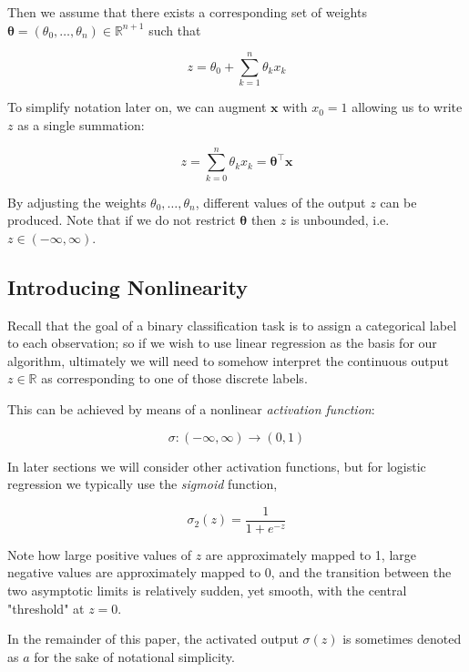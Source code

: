 \documentclass{article}[11pt]
\begin{document}
        Then we assume that there exists a corresponding set of weights $\boldsymbol{\theta} = (\theta_0, \ldots, \theta_n) \in \mathbb{R}^{n+1}$ such that
        
        $$
        z = \theta_0 + \sum_{k=1}^n \theta_k x_k
        $$
        
        To simplify notation later on, we can augment $\mathbf{x}$ with $x_0 = 1$ allowing us to write $z$ as a single summation:
        
        $$
        z = \sum_{k=0}^n \theta_k x_k = \boldsymbol{\theta}^\top \mathbf{x}
        $$
        
        By adjusting the weights $\theta_0, \ldots, \theta_n$, different values of the output $z$ can be produced. Note that if we do not restrict $\boldsymbol{\theta}$ then $z$ is unbounded, i.e. $z \in (-\infty, \infty)$.
        
        
        
    \subsection{Introducing Nonlinearity}
        
        Recall that the goal of a binary classification task is to assign a categorical label to each observation; so if we wish to use linear regression as the basis for our algorithm, ultimately we will need to somehow interpret the continuous output $z \in \mathbb{R}$ as corresponding to one of those discrete labels.
        
        This can be achieved by means of a nonlinear \textit{activation function}:
        
        $$
        \sigma \colon (-\infty, \infty) \to (0, 1)
        $$
        
        In later sections we will consider other activation functions, but for logistic regression we typically use the \textit{sigmoid} function,
            
        $$
        \sigma_2(z) = \frac{1}{1 + e^{-z}}
        $$
        
        
        
        
        Note how large positive values of $z$ are approximately mapped to 1, large negative values are approximately mapped to 0, and the transition between the two asymptotic limits is relatively sudden, yet smooth, with the central "threshold" at $z = 0$.
        
        In the remainder of this paper, the activated output $\sigma(z)$ is sometimes denoted as $a$ for the sake of notational simplicity.
        
\end{document}
